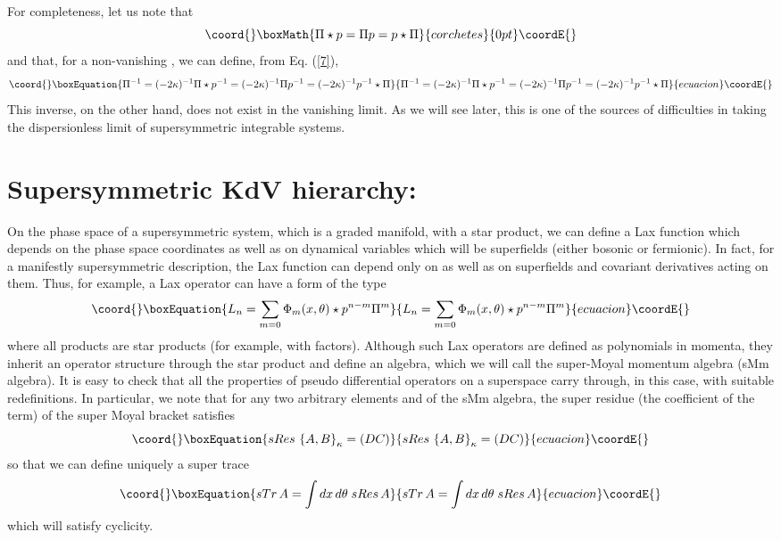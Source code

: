 \documentclass[a4paper,11pt]{article}
\begin{document}
For completeness, let us note that
\[\coord{}\boxMath{
\Pi\star p = \Pi p = p\star \Pi 
}{corchetes}{0pt}\coordE{}\]
and that, for a non-vanishing \myHighlight{$\kappa$}\coordHE{}, we can define, from Eq. (\ref{7}),
\begin{equation}\coord{}\boxEquation{
\Pi^{-1} = (-2\kappa)^{-1} \Pi\star p^{-1} = (-2\kappa)^{-1}\Pi p^{-1}
= (-2\kappa)^{-1} p^{-1}\star \Pi\label{10}
}{
\Pi^{-1} = (-2\kappa)^{-1} \Pi\star p^{-1} = (-2\kappa)^{-1}\Pi p^{-1}
= (-2\kappa)^{-1} p^{-1}\star \Pi}{ecuacion}\coordE{}\end{equation}
This inverse, on the other hand, does not exist in the vanishing \myHighlight{$\kappa$}\coordHE{}
limit. As we will see later, this is one of the sources of
difficulties in taking the dispersionless limit of supersymmetric
integrable systems.

\section{Supersymmetric KdV hierarchy:}

On the phase space of a supersymmetric system, which is a graded
manifold, with a star product, we can define a Lax function which 
depends on the phase space coordinates as well as on dynamical
variables which will be superfields (either bosonic or fermionic). In
fact, for a manifestly supersymmetric description, the Lax function
can depend only on \coordHE{} as well as on superfields and 
covariant derivatives acting on them. Thus, for example, a  
Lax operator can have a form of the type
\begin{equation}\coord{}\boxEquation{
L_{n} = \sum_{m=0} \Phi_{m}(x,\theta)\star p^{n-m}\Pi^{m}\label{11}
}{
L_{n} = \sum_{m=0} \Phi_{m}(x,\theta)\star p^{n-m}\Pi^{m}}{ecuacion}\coordE{}\end{equation}
where all products are star products (for example,
\coordHE{} with \coordHE{} factors). Although such
Lax  operators are defined as polynomials in momenta,
they inherit an operator structure through the star product and define
an algebra, which we will call the super-Moyal momentum algebra (sMm
algebra). It is easy to check that all the properties of pseudo
differential operators on a superspace carry through, in this case,
with suitable redefinitions. In particular, we note that for any two
arbitrary elements \coordHE{} and \coordHE{} of the sMm algebra, the super residue
(the coefficient of the \coordHE{} term) of the super Moyal bracket
satisfies
\begin{equation}\coord{}\boxEquation{
sRes\,\left\{A,B\right\}_{\kappa} = (DC)
}{
sRes\,\left\{A,B\right\}_{\kappa} = (DC)
}{ecuacion}\coordE{}\end{equation}
so that we can define uniquely a super trace
\begin{equation}\coord{}\boxEquation{
sTr\,A = \int dx\,d\theta\;sRes\,A\label{11'}
}{
sTr\,A = \int dx\,d\theta\;sRes\,A}{ecuacion}\coordE{}\end{equation}
which will satisfy cyclicity.
\end{document}
